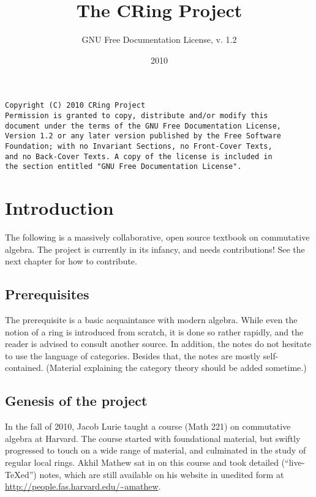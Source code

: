 
\nocite{*}

\title{The CRing Project}
\author{GNU Free Documentation License, v. 1.2}
\date{2010}

\maketitle
\begin{verbatim}
Copyright (C) 2010 CRing Project 
Permission is granted to copy, distribute and/or modify this
document under the terms of the GNU Free Documentation License,
Version 1.2 or any later version published by the Free Software
Foundation; with no Invariant Sections, no Front-Cover Texts,
and no Back-Cover Texts. A copy of the license is included in
the section entitled "GNU Free Documentation License". \end{verbatim}


\fancyhead{}
\fancyfoot{}
\tableofcontents

\newpage 


\pagestyle{fancy}



\chapter*{Introduction}

The following is a massively collaborative, open source textbook on
commutative algebra. The project is currently in its infancy, and needs
contributions! See the next chapter for how to contribute.

\section*{Prerequisites}
The prerequisite  is a basic acquaintance with modern
algebra. While even the notion of a ring is introduced from scratch, it is
done so rather rapidly, and the reader is advised to consult another source.
In addition, the notes do not hesitate to use the language of categories.
Besides that, the notes are mostly self-contained. (Material explaining the
category theory should be added sometime.) 

\section*{Genesis of the project}
In the fall of 2010, Jacob Lurie taught a course (Math 221) on commutative
algebra at Harvard. 
The course started with foundational material, but swiftly progressed to touch on a wide range of
material, and culminated in the study of regular local rings. 
Akhil Mathew sat in on this course and took detailed
(``live-\TeX ed'') notes, which are still available on his website in unedited
form at 
\url{http://people.fas.harvard.edu/~amathew}. 

